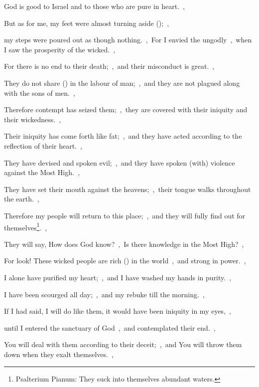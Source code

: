 \documentclass[12pt,twoside,a5paper]{article}
\begin{document}
\begin{normalparskip}
  God is good to Israel and to those who are pure in heart.~\sep

  But as for me, my feet were almost turning aside ();~\sep


  my steps were poured out as though nothing.~\sep\ For I envied the ungodly~\sep\ when I saw the prosperity of the wicked.~\sep

  For there is no end to their death;~\sep\ and their misconduct is great.~\sep

  They do not share () in the labour of man;~\sep\ and they are not plagued along with the sons of men.~\sep

  Therefore contempt has seized them;~\sep\ they are covered with their iniquity and their wickedness.~\sep

  Their iniquity has come forth like fat;~\sep\ and they have acted according to the reflection of their heart.~\sep

  They have devised and spoken evil;~\sep\ and they have spoken (with) violence against the Most High.~\sep

  They have set their mouth against the heavens;~\sep\ their tongue walks throughout the earth.~\sep

  Therefore my people will return to this place;~\sep\ and they will fully find out for themselves\footnote{Psalterium Pianum: They suck into themselves abundant waters.}.~\sep

  They will say, How does God know?~\sep\ Is there knowledge in the Most High?~\sep

  For look! These wicked people are rich () in the world~\sep\ and strong in power.~\sep

  I alone have purified my heart;~\sep\ and I have washed my hands in purity.~\sep

  I have been scourged all day;~\sep\ and my rebuke till the morning.~\sep

  If I had said, I will do like them, it would have been iniquity in my eyes,~\sep

  until I entered the sanctuary of God~\sep\ and contemplated their end.~\sep

  You will deal with them according to their deceit;~\sep\ and You will throw them down when they exalt themselves.~\sep


\end{normalparskip}
\end{document}
